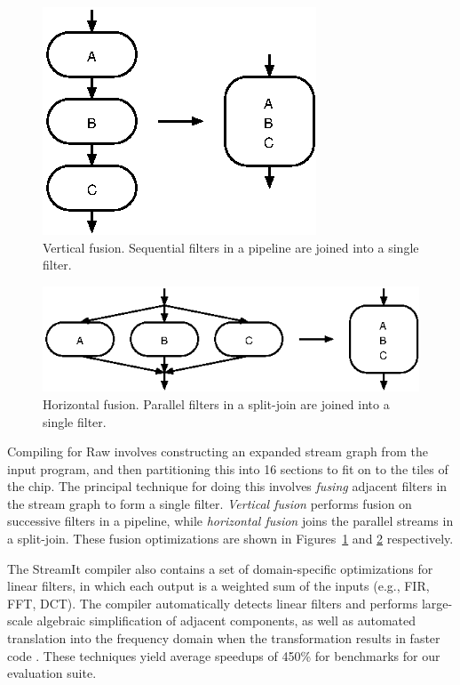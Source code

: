 \begin{figure}
  \centering
  \includegraphics{fusion-vert}
  \caption{Vertical fusion.  Sequential filters in a pipeline are
    joined into a single filter.}
  \label{fig:vert-fusion}
\end{figure}
\begin{figure}
  \centering
  \includegraphics{fusion-horiz}
  \caption{Horizontal fusion.  Parallel filters in a split-join are
    joined into a single filter.}
  \label{fig:horiz-fusion}
\end{figure}

Compiling for Raw involves constructing an expanded stream graph from
the input program, and then partitioning this into 16 sections to fit
on to the tiles of the chip\cite{gordon02}.  The principal technique
for doing this involves \emph{fusing} adjacent filters in the stream
graph to form a single filter.  \emph{Vertical fusion} performs fusion
on successive filters in a pipeline, while \emph{horizontal fusion}
joins the parallel streams in a split-join.  These fusion
optimizations are shown in Figures~\ref{fig:vert-fusion} and
\ref{fig:horiz-fusion} respectively.

The  StreamIt   compiler  also  contains  a   set  of  domain-specific
optimizations for linear  filters, in which each output  is a weighted
sum of  the inputs (e.g.,  FIR, FFT, DCT). The  compiler automatically
detects   linear   filters    and   performs   large-scale   algebraic
simplification   of  adjacent   components,  as   well   as  automated
translation into the frequency  domain when the transformation results
in  faster  code \cite{lamb-pldi03}.  These  techniques yield  average
speedups of 450\% for benchmarks for our evaluation suite.

